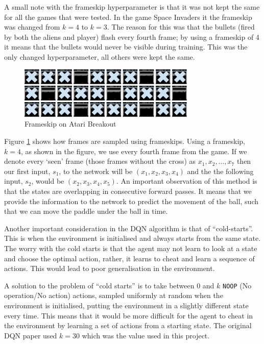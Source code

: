 A small note with the frameskip hyperparameter is that it was not kept the same for all the games that were tested. In the game Space Invaders it the frameskip was changed from $k = 4$ to $k = 3$. The reason for this was that the bullets (fired by both the aliens and player) flash every fourth frame; by using a frameskip of 4 it means that the bullets would never be visible during training. This was the only changed hyperparameter, all others were kept the same.

\begin{figure}[htbp]
	\centering
	\includegraphics[width=0.75\textwidth]{chapters/chapter4/images/frameskip.png}
	\caption{Frameskip on Atari Breakout
		\label{fig:frameskip}
	}
\end{figure}

Figure \ref{fig:frameskip} shows how frames are sampled using frameskips. Using a frameskip, $k = 4$, as shown in the figure, we use every fourth frame from the game. If we denote every `seen' frame (those frames without the cross) as $x_1, x_2, \hdots, x_7$ then our first input, $s_1$, to the network will be $(x_1, x_2, x_3, x_4)$ and the the following input, $s_2$, would be $(x_2, x_3, x_4, x_5)$. An important observation of this method is that the states are overlapping in consecutive forward passes. It means that we provide the information to the network to predict the movement of the ball, such that we can move the paddle under the ball in time.

Another important consideration in the DQN algorithm is that of ``cold-starts''. This is when the environment is initialised and always starts from the same state. The worry with the cold starts is that the agent may not learn to look at a state and choose the optimal action, rather, it learns to cheat and learn a sequence of actions. This would lead to poor generalisation in the environment.

A solution to the problem of ``cold starts'' is to take between 0 and $k$ \texttt{NOOP} (No operation/No action) actions, sampled uniformly at random when the environment is initialised, putting the environment in a slightly different state every time. This means that it would be more difficult for the agent to cheat in the environment by learning a set of actions from a starting state. The original DQN paper \cite{dqn} used $k = 30$ which was the value used in this project.

